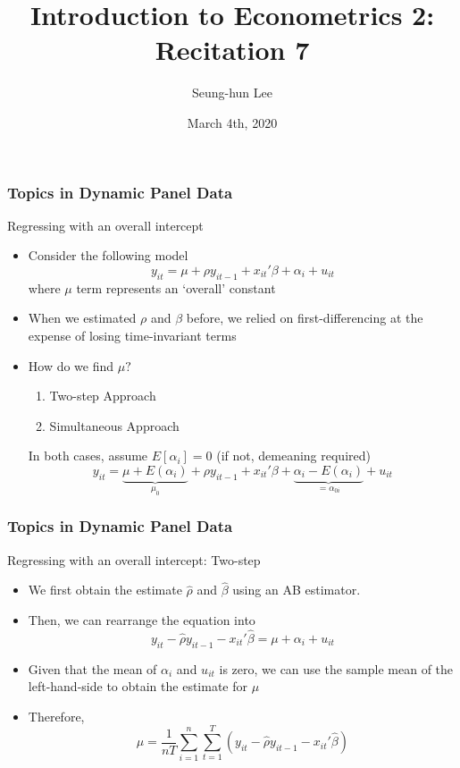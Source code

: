 \documentclass{beamer}
\title[Econometrics 2]{Introduction to Econometrics 2: Recitation 7} %
\author{Seung-hun Lee}
\institute{Columbia University}
\date{March 4th, 2020}
\begin{document}
\begin{frame}
\titlepage
\end{frame}


\begin{frame}
\frametitle{Topics in Dynamic Panel Data}
Regressing with an overall intercept
\begin{itemize}
\item Consider the following model
\[
y_{it}=\mu+\rho y_{it-1}+x_{it}'\beta+\alpha_i + u_{it}
\]
where $\mu$ term represents an `overall' constant
\item When we estimated $\rho$ and $\beta$ before, we relied on first-differencing at the expense of losing time-invariant terms
\item How do we find $\mu?$
\begin{enumerate}
\item Two-step Approach
\item Simultaneous Approach
\end{enumerate}
In both cases, assume $E[\alpha_i]=0$ (if not, demeaning required)
\[
y_{it}=\underbrace{\mu+E(\alpha_i)}_{\mu_0}+\rho y_{it-1}+x_{it}'\beta+\underbrace{\alpha_i-E(\alpha_i)}_{=\alpha_{0i}} + u_{it}
\]
\end{itemize}
\end{frame}

\begin{frame}
\frametitle{Topics in Dynamic Panel Data}
Regressing with an overall intercept: Two-step
\begin{itemize}
\item We first obtain the estimate $\hat{\rho}$ and $\hat{\beta}$ using an AB estimator. 
\item Then, we can rearrange the equation into
\[
y_{it}-\hat{\rho} y_{it-1}-x_{it}'\hat{\beta}=\mu+\alpha_i + u_{it}
\]
\item Given that the mean of $\alpha_i$ and $u_{it}$ is zero, we can use the sample mean of the left-hand-side to obtain the estimate for $\mu$
\item Therefore, 
\[
\hat{\mu}=\frac{1}{nT}\sum_{i=1}^n \sum_{t=1}^T\left(y_{it}-\hat{\rho} y_{it-1}-x_{it}'\hat{\beta}\right)
\]
\end{itemize}
\end{frame}
\end{document}
